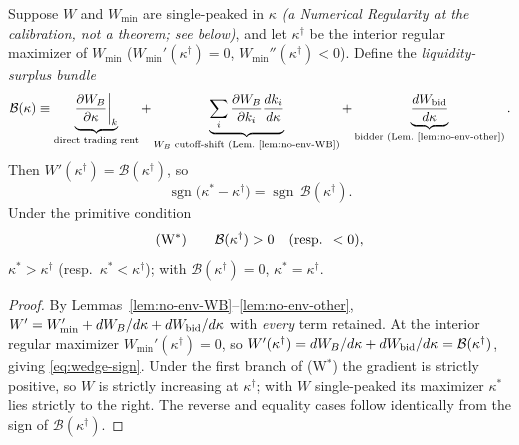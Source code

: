 \begin{proposition}
\label{prop:planner-wedge}
Suppose $W$ and $W_{\min}$ are single-peaked in $\kappa$ \emph{(a Numerical
Regularity at the calibration, not a theorem; see below)}, and let
$\kappa^{\dagger}$ be the interior regular maximizer of $W_{\min}$
($W_{\min}'(\kappa^{\dagger})=0$, $W_{\min}''(\kappa^{\dagger})<0$). Define the
\emph{liquidity-surplus bundle}
\begin{equation}
\mathcal B(\kappa)\equiv
\underbrace{\frac{\partial W_B}{\partial\kappa}\bigg|_{k}}_{\text{direct trading rent}}
+\underbrace{\sum_{i}\frac{\partial W_B}{\partial k_i}\frac{dk_i}{d\kappa}}_{\text{$W_B$ cutoff-shift (Lem.~\ref{lem:no-env-WB})}}
+\underbrace{\frac{dW_{\textup{bid}}}{d\kappa}}_{\text{bidder (Lem.~\ref{lem:no-env-other})}}.
\label{eq:bundle}
\end{equation}
Then $W'(\kappa^{\dagger})=\mathcal B(\kappa^{\dagger})$, so
\begin{equation}
\operatorname{sgn}\big(\kappa^{\ast}-\kappa^{\dagger}\big)
   =\operatorname{sgn}\,\mathcal B(\kappa^{\dagger}).
\label{eq:wedge-sign}
\end{equation}
Under the primitive condition
\begin{equation}
\textup{(W$^{\ast}$)}\qquad \mathcal B(\kappa^{\dagger})>0
\quad(\text{resp. }<0),
\label{eq:Wstar}
\end{equation}
$\kappa^{\ast}>\kappa^{\dagger}$ (resp.\ $\kappa^{\ast}<\kappa^{\dagger}$);
with $\mathcal B(\kappa^{\dagger})=0$, $\kappa^{\ast}=\kappa^{\dagger}$.
\end{proposition}

\begin{proof}
By Lemmas~\ref{lem:no-env-WB}--\ref{lem:no-env-other},
$W'=W_{\min}'+dW_B/d\kappa+dW_{\textup{bid}}/d\kappa$ with \emph{every} term
retained. At the interior regular maximizer $W_{\min}'(\kappa^{\dagger})=0$, so
$W'(\kappa^{\dagger})=dW_B/d\kappa+dW_{\textup{bid}}/d\kappa
=\mathcal B(\kappa^{\dagger})$, giving \eqref{eq:wedge-sign}. Under the first
branch of (W$^{\ast}$) the gradient is strictly positive, so $W$ is strictly
increasing at $\kappa^{\dagger}$; with $W$ single-peaked its maximizer
$\kappa^{\ast}$ lies strictly to the right. The reverse and equality cases follow
identically from the sign of $\mathcal B(\kappa^{\dagger})$.
\end{proof}

